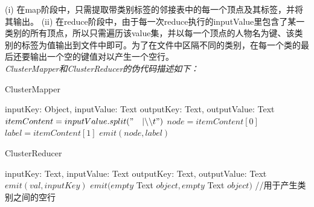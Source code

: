 (i) 在map阶段中，只需提取带类别标签的邻接表中的每一个顶点及其标签，并将其输出。
(ii) 在reduce阶段中，由于每一次reduce执行的inputValue里包含了某一类别的所有顶点，所以只需遍历该value集，并以每一个顶点的人物名为键、该类别的标签为值输出到文件中即可。为了在文件中区隔不同的类别，在每一个类的最后还要输出一个空的键值对以产生一个空行。
\\
\emph{ClusterMapper和ClusterReducer的伪代码描述如下：}
\begin{algorithm}[H]
    \caption{ClusterMapper}
    \begin{algorithmic}[1]
        \REQUIRE inputKey: Object, inputValue: Text
        \ENSURE outputKey: Text, outputValue: Text
        \STATE $itemContent = inputValue.split("\quad |\backslash\backslash t")$
        \STATE $node = itemContent[0]$
        \STATE $label = itemContent[1]$
        \STATE $emit(node, label)$
    \end{algorithmic}
\end{algorithm}
\begin{algorithm}[H]
    \caption{ClusterReducer}
    \begin{algorithmic}[1]
        \REQUIRE inputKey: Text, inputValue: Text
        \ENSURE outputKey: Text, outputValue: Text
        \STATE $emit(val, inputKey)$
        \ENDFOR
        \STATE $emit(empty$ Text $object, empty$ Text $object)$ //用于产生类别之间的空行
    \end{algorithmic}
\end{algorithm}